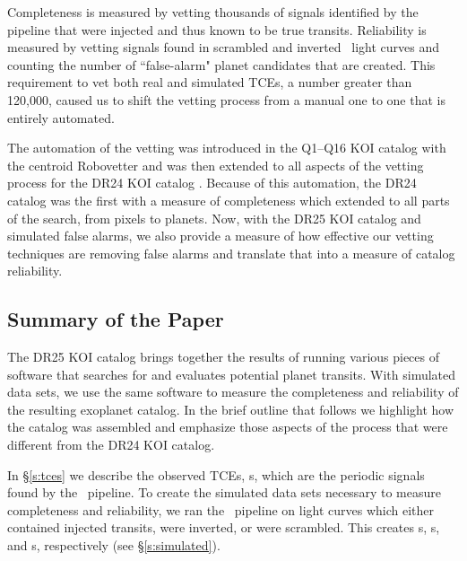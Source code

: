 Completeness is measured by vetting thousands of signals identified by the pipeline that were injected and thus known to be true transits. Reliability is measured by vetting signals found in scrambled and inverted \Kepler\ light curves and counting the number of ``false-alarm" planet candidates that are created. This requirement to vet both real and simulated TCEs, a number greater than 120,000, caused us to shift the vetting process from a manual one to one that is entirely automated.  

The automation of the vetting was introduced in the Q1--Q16 KOI catalog \citep{Mullally2015cat} with the centroid Robovetter and was then extended to all aspects of the vetting process for the DR24 KOI catalog \citep{Coughlin2016}. Because of this automation, the DR24 catalog was the first with a measure of completeness which extended to all parts of the search, from pixels to planets.  Now, with the DR25 KOI catalog and simulated false alarms, we also provide a measure of how effective our vetting techniques are removing false alarms and translate that into a measure of catalog reliability.

\subsection{Summary of the Paper}

The DR25 KOI catalog brings together the results of running various pieces of software that searches for and evaluates potential planet transits. With simulated data sets, we use the same software to measure the completeness and reliability of the resulting exoplanet catalog.  In the brief outline that follows we highlight how the catalog was assembled and emphasize those aspects of the process that were different from the DR24 KOI catalog.

In \S\ref{s:tces} we describe the observed TCEs, \opstce s, which are the periodic signals found by the \Kepler\ pipeline. To create the simulated data sets necessary to measure completeness and reliability, we ran the \Kepler\ pipeline on light curves which either contained injected transits, were inverted, or were scrambled. This creates \injtce s, \invtce s, and \scrtce s, respectively (see \S\ref{s:simulated}).  

